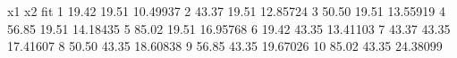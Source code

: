 \begin{Schunk}
\begin{Soutput}
      x1    x2      fit
1  19.42 19.51 10.49937
2  43.37 19.51 12.85724
3  50.50 19.51 13.55919
4  56.85 19.51 14.18435
5  85.02 19.51 16.95768
6  19.42 43.35 13.41103
7  43.37 43.35 17.41607
8  50.50 43.35 18.60838
9  56.85 43.35 19.67026
10 85.02 43.35 24.38099
\end{Soutput}
\end{Schunk}
